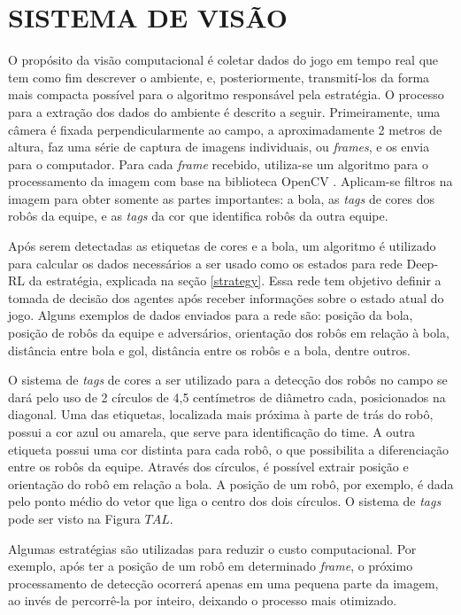 \section{SISTEMA DE VISÃO}\label{vision}

O propósito da visão computacional é coletar dados do jogo em tempo real que tem como fim descrever o ambiente, e, posteriormente, transmití-los da forma mais compacta possível para o algoritmo responsável pela estratégia.
O processo para a extração dos dados do ambiente é descrito a seguir.
Primeiramente, uma câmera é fixada perpendicularmente ao campo, a aproximadamente 2 metros de altura, faz uma série de captura de imagens individuais, ou \textit{frames}, e os envia para o computador.
Para cada \textit{frame} recebido, utiliza-se um algoritmo para o processamento da imagem com base na biblioteca OpenCV \cite{bradski2008learning}.
Aplicam-se filtros na imagem para obter somente as partes importantes: a bola, as \textit{tags} de cores dos robôs da equipe, e as \textit{tags} da cor que identifica robôs da outra equipe.

Após serem detectadas as etiquetas de cores e a bola, um algoritmo é utilizado para calcular os dados necessários a ser usado como os estados para rede Deep-RL da estratégia, explicada na seção
\ref{strategy}.
Essa rede tem objetivo definir a tomada de decisão dos agentes após receber informações sobre o estado atual do jogo.
Alguns exemplos de dados enviados para a rede são: posição da bola, posição de robôs da equipe e adversários, orientação dos robôs em relação à bola, distância entre bola e gol, distância entre os robôs e a bola, dentre outros. 

O sistema de \textit{tags} de cores a ser utilizado para a detecção dos robôs no campo se dará pelo uso de 2 círculos de 4,5 centímetros de diâmetro cada, posicionados na diagonal.
Uma das etiquetas, localizada mais próxima à parte de trás do robô, possui a cor azul ou amarela, que serve para identificação do time.
A outra etiqueta possui uma cor distinta para cada robô, o que possibilita a diferenciação entre os robôs da equipe.
Através dos círculos, é possível extrair posição e orientação do robô em relação a bola.
A posição de um robô, por exemplo, é dada pelo ponto médio do vetor que liga o centro dos dois círculos.
O sistema de \textit{tags} pode ser visto na Figura $T A L$.

Algumas estratégias são utilizadas para reduzir o custo computacional. Por exemplo, após ter a posição de um robô em determinado \textit{frame}, o próximo processamento de detecção ocorrerá apenas em uma pequena parte da imagem, ao invés de percorrê-la por inteiro, deixando o processo mais otimizado.